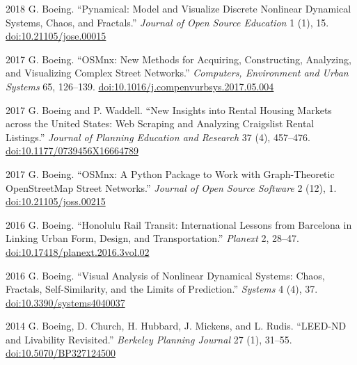 \documentclass[11pt,letterpaper]{report}
\begin{document}
\begin{tablist}
        \item[2018] \tab{}G. Boeing. \enquote{Pynamical: Model and Visualize Discrete Nonlinear Dynamical Systems, Chaos, and Fractals.} \textit{Journal of Open Source Education} 1 (1), 15. \href{https://doi.org/10.21105/jose.00015}{doi:10.21105/jose.00015}

        \item[2017] \tab{}G. Boeing. \enquote{OSMnx: New Methods for Acquiring, Constructing, Analyzing, and Visualizing Complex Street Networks.} \textit{Computers, Environment and Urban Systems} 65, 126--139. \href{https://doi.org/10.1016/j.compenvurbsys.2017.05.004}{doi:10.1016/j.compenvurbsys.2017.05.004}

        \item[2017] \tab{}G. Boeing and P. Waddell. \enquote{New Insights into Rental Housing Markets across the United States: Web Scraping and Analyzing Craigslist Rental Listings.} \textit{Journal of Planning Education and Research} 37 (4), 457--476. \href{https://doi.org/10.1177/0739456X16664789}{doi:10.1177/0739456X16664789}

        \item[2017] \tab{}G. Boeing. \enquote{OSMnx: A Python Package to Work with Graph-Theoretic OpenStreetMap Street Networks.} \textit{Journal of Open Source Software} 2 (12), 1. \href{https://doi.org/10.21105/joss.00215}{doi:10.21105/joss.00215}

        \item[2016] \tab{}G. Boeing. \enquote{Honolulu Rail Transit: International Lessons from Barcelona in Linking Urban Form, Design, and Transportation.} \textit{Planext} 2, 28--47. \href{https://doi.org/10.17418/planext.2016.3vol.02}{doi:10.17418/planext.2016.3vol.02}

        \item[2016] \tab{}G. Boeing. \enquote{Visual Analysis of Nonlinear Dynamical Systems: Chaos, Fractals, Self-Similarity, and the Limits of Prediction.} \textit{Systems} 4 (4), 37. \href{https://doi.org/10.3390/systems4040037}{doi:10.3390/systems4040037}

        \item[2014] \tab{}G. Boeing, D. Church, H. Hubbard, J. Mickens, and L. Rudis. \enquote{LEED-ND and Livability Revisited.} \textit{Berkeley Planning Journal} 27 (1), 31--55. \href{https://doi.org/10.5070/BP327124500}{doi:10.5070/BP327124500}

    \end{tablist}
\end{document}
